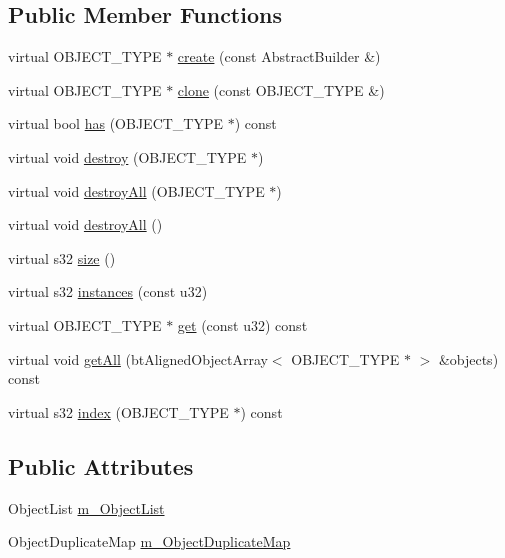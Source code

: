 \subsection*{Public Member Functions}
\begin{DoxyCompactItemize}
\item 
virtual O\+B\+J\+E\+C\+T\+\_\+\+T\+Y\+P\+E $\ast$ \hyperlink{class_abstract_shared_factory_ac2ca077592316dd585c317a992f9fd0d}{create} (const Abstract\+Builder \&)
\item 
virtual O\+B\+J\+E\+C\+T\+\_\+\+T\+Y\+P\+E $\ast$ \hyperlink{class_abstract_shared_factory_a93557cabaee0680f5870f25a28d25293}{clone} (const O\+B\+J\+E\+C\+T\+\_\+\+T\+Y\+P\+E \&)
\item 
virtual bool \hyperlink{class_abstract_shared_factory_abe6198f1845cd1489e1208593614afe8}{has} (O\+B\+J\+E\+C\+T\+\_\+\+T\+Y\+P\+E $\ast$) const 
\item 
virtual void \hyperlink{class_abstract_shared_factory_a5b129772c8bcea8a059dbc21fb07ddce}{destroy} (O\+B\+J\+E\+C\+T\+\_\+\+T\+Y\+P\+E $\ast$)
\item 
virtual void \hyperlink{class_abstract_shared_factory_ae61501ab1af1ed320eac60d343e4f6b2}{destroy\+All} (O\+B\+J\+E\+C\+T\+\_\+\+T\+Y\+P\+E $\ast$)
\item 
virtual void \hyperlink{class_abstract_shared_factory_aacc07c2878fdf2500c8f32c71bf072b6}{destroy\+All} ()
\item 
virtual s32 \hyperlink{class_abstract_shared_factory_ad97ae0ec1e4154043314397da521c3da}{size} ()
\item 
virtual s32 \hyperlink{class_abstract_shared_factory_ad7b87235816684988ee876708d0a2938}{instances} (const u32)
\item 
virtual O\+B\+J\+E\+C\+T\+\_\+\+T\+Y\+P\+E $\ast$ \hyperlink{class_abstract_shared_factory_a11862977dff261201ff23bc3e25ad0c2}{get} (const u32) const 
\item 
virtual void \hyperlink{class_abstract_shared_factory_a6c2d3fa9693726781e81d52f141a3b0a}{get\+All} (bt\+Aligned\+Object\+Array$<$ O\+B\+J\+E\+C\+T\+\_\+\+T\+Y\+P\+E $\ast$ $>$ \&objects) const 
\item 
virtual s32 \hyperlink{class_abstract_shared_factory_aa6f6481274b9468b92d1b032cd7a32df}{index} (O\+B\+J\+E\+C\+T\+\_\+\+T\+Y\+P\+E $\ast$) const 
\end{DoxyCompactItemize}
\subsection*{Public Attributes}
\begin{DoxyCompactItemize}
\item 
Object\+List \hyperlink{class_abstract_shared_factory_adc52945f7c9e7d22a790168090164ae4}{m\+\_\+\+Object\+List}
\item 
Object\+Duplicate\+Map \hyperlink{class_abstract_shared_factory_a6640dd3209b932e973547cf9f7ecf758}{m\+\_\+\+Object\+Duplicate\+Map}
\end{DoxyCompactItemize}
